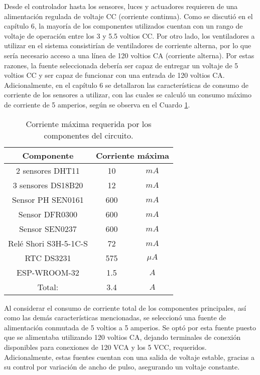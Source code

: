 Desde el controlador hasta los sensores, luces y actuadores requieren de una alimentación regulada de voltaje CC (corriente continua). Como se discutió en el capítulo 6, la mayoría de los componentes utilizados cuentan con un rango de voltaje de operación entre los 3 y 5.5 voltios CC. Por otro lado, los ventiladores a utilizar en el sistema consistirían de ventiladores de corriente alterna, por lo que sería necesario acceso a una línea de 120 voltios CA (corriente alterna). Por estas razones, la fuente seleccionada debería ser capaz de entregar un voltaje de 5 voltios CC y ser capaz de funcionar con una entrada de 120 voltios CA. Adicionalmente, en el capítulo 6 se detallaron las características de consumo de corriente de los sensores a utilizar, con las cuales se calculó un consumo máximo de corriente de 5 amperios, según se observa en el Cuardo \ref{cuadro:corriente_sensores}.

\begin{table}[H]
	\centering
	\begin{tabular}{|c|c|c|} \hline
		\textbf{Componente} & \multicolumn{2}{c|}{\textbf{Corriente máxima}} \\ \hline
		2 sensores DHT11 & 10 & $mA$ \\ \hline
		3 sensores DS18B20 & 12 & $mA$ \\ \hline
		Sensor PH SEN0161 & 600 & $mA$ \\ \hline
		Sensor DFR0300 & 600 & $mA$ \\ \hline
		Sensor SEN0237 & 600 & $mA$ \\ \hline
		Relé Shori S3H-5-1C-S & 72 & $mA$ \\ \hline
		RTC DS3231 & 575 & $\mu A$ \\ \hline
		ESP-WROOM-32 & 1.5 & $A$ \\ \hline
		Total: & 3.4 & $A$ \\ \hline
	\end{tabular}
	\caption{Corriente máxima requerida por los componentes del circuito.}
	\label{cuadro:corriente_sensores}
\end{table}

Al considerar el consumo de corriente total de los componentes principales, así como las demás características mencionadas, se seleccionó una fuente de alimentación conmutada de 5 voltios a 5 amperios. Se optó por esta fuente puesto que se alimentaba utilizando 120 voltios CA, dejando terminales de conexión disponibles para conexiones de 120 VCA y los 5 VCC, requeridos. Adicionalmente, estas fuentes cuentan con una salida de voltaje estable, gracias a su control por variación de ancho de pulso, asegurando un voltaje constante.

